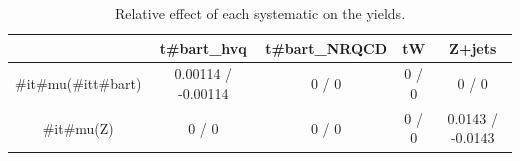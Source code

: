 \documentclass[10pt]{article}
\begin{document}
\begin{table}[htbp]
\begin{center}
\begin{tabular}{|c|c|c|c|c|}
\hline 
      & t#bar{t}_{hvq}      & t#bar{t}_{NRQCD}      & tW      & Z+jets \\ 
\hline 
  #it{#mu}(#it{t#bar{t}}) & 0.00114 / -0.00114 & 0 / 0 & 0 / 0 & 0 / 0 \\ 
  #it{#mu}(Z) & 0 / 0 & 0 / 0 & 0 / 0 & 0.0143 / -0.0143 \\ 
\hline 
\end{tabular} 
\caption{Relative effect of each systematic on the yields.} 
\end{center} 
\end{table} 
\end{document}
